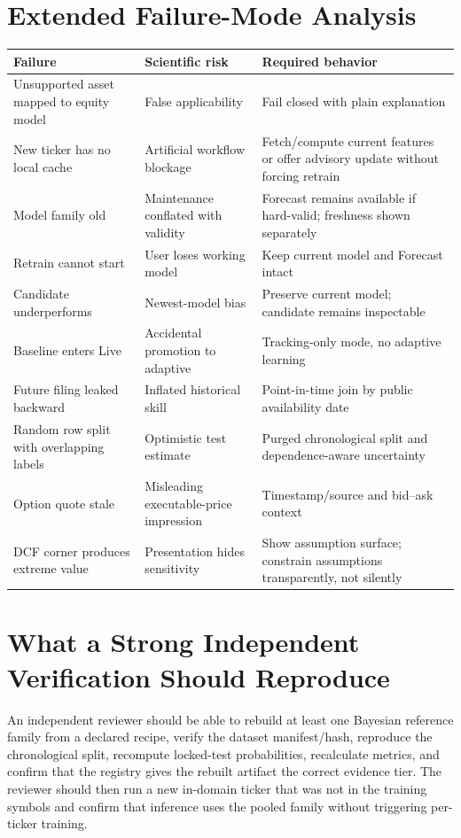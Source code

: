 \documentclass[11pt]{article}
\begin{document}
\section{Extended Failure-Mode Analysis}
\begin{longtable}{p{}p{}p{}}
\toprule
Failure & Scientific risk & Required behavior\\
\midrule
Unsupported asset mapped to equity model & False applicability & Fail closed with plain explanation\\
New ticker has no local cache & Artificial workflow blockage & Fetch/compute current features or offer advisory update without forcing retrain\\
Model family old & Maintenance conflated with validity & Forecast remains available if hard-valid; freshness shown separately\\
Retrain cannot start & User loses working model & Keep current model and Forecast intact\\
Candidate underperforms & Newest-model bias & Preserve current model; candidate remains inspectable\\
Baseline enters Live & Accidental promotion to adaptive & Tracking-only mode, no adaptive learning\\
Future filing leaked backward & Inflated historical skill & Point-in-time join by public availability date\\
Random row split with overlapping labels & Optimistic test estimate & Purged chronological split and dependence-aware uncertainty\\
Option quote stale & Misleading executable-price impression & Timestamp/source and bid--ask context\\
DCF corner produces extreme value & Presentation hides sensitivity & Show assumption surface; constrain assumptions transparently, not silently\\
\bottomrule
\end{longtable}

\section{What a Strong Independent Verification Should Reproduce}
An independent reviewer should be able to rebuild at least one Bayesian reference family from a declared recipe, verify the dataset manifest/hash, reproduce the chronological split, recompute locked-test probabilities, recalculate metrics, and confirm that the registry gives the rebuilt artifact the correct evidence tier. The reviewer should then run a new in-domain ticker that was not in the training symbols and confirm that inference uses the pooled family without triggering per-ticker training.
\end{document}
